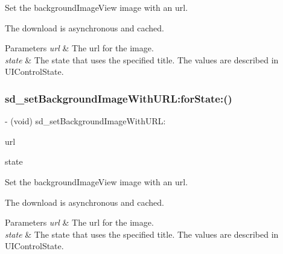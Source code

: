 Set the background\+Image\+View {\ttfamily image} with an {\ttfamily url}.

The download is asynchronous and cached.


\begin{DoxyParams}{Parameters}
{\em url} & The url for the image. \\
\hline
{\em state} & The state that uses the specified title. The values are described in U\+I\+Control\+State. \\
\hline
\end{DoxyParams}
\mbox{\label{category_u_i_button_07_web_cache_08_a089b2c745708bd54f980521be6755d59}} 
\subsubsection{\texorpdfstring{sd\+\_\+set\+Background\+Image\+With\+U\+R\+L\+:for\+State\+:()}{sd\_setBackgroundImageWithURL:forState:()}\hspace{0.1cm}{\footnotesize\ttfamily [2/3]}}
{\footnotesize\ttfamily -\/ (void) sd\+\_\+set\+Background\+Image\+With\+U\+R\+L\+: \begin{DoxyParamCaption}\item[{(N\+S\+U\+RL $\ast$)}]{url }\item[{forState:(U\+I\+Control\+State)}]{state }\end{DoxyParamCaption}}

Set the background\+Image\+View {\ttfamily image} with an {\ttfamily url}.

The download is asynchronous and cached.


\begin{DoxyParams}{Parameters}
{\em url} & The url for the image. \\
\hline
{\em state} & The state that uses the specified title. The values are described in U\+I\+Control\+State. \\
\hline
\end{DoxyParams}
\mbox{\label{category_u_i_button_07_web_cache_08_a089b2c745708bd54f980521be6755d59}} 
